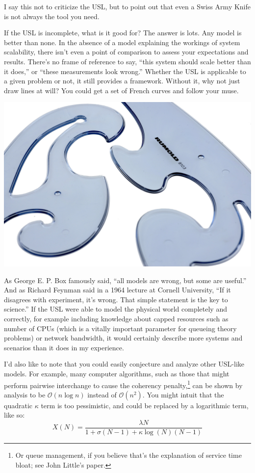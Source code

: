 \documentclass{vivid_layout}
\begin{document}
I say this not to criticize the USL, but to point out that even a Swiss Army
Knife is not always the tool you need.

If the USL is incomplete, what is it good for? The answer is lots.
Any model is better than none. In the absence of a model
explaining the workings of system scalability, there isn't even a point of
comparison to assess your expectations and results. There's no frame of
reference to say, ``this system should scale better than it does,'' or
``these measurements look wrong.'' Whether the USL is applicable to a
given problem or not, it still provides a framework. Without it, why not just
draw lines at will? You could get a set of French curves and follow your muse.
\begin{center}
\includegraphics[width=.75\linewidth,trim={0 8cm 0 0},clip]{scalability/french_curve}
\end{center}

As George E. P. Box famously said, ``all models are wrong, but some are
useful.'' And as Richard Feynman said in a 1964 lecture at Cornell University,
``If it disagrees with experiment, it’s wrong.  That simple statement is the key
to science.'' If the USL were able to model the physical world completely and
correctly, for example including knowledge about capped resources such as number
of CPUs (which is a vitally important parameter for queueing theory problems) or
network bandwidth, it would certainly describe more systems and scenarios than
it does in my experience.

I'd also like to note that you could easily conjecture and analyze other
USL-like models. For example, many computer algorithms, such as those that might
perform pairwise interchange to cause the coherency penalty,\footnote{Or queue
management, if you believe that's the explanation of service time bloat; see
John Little's paper.} can be
shown by analysis to be $\mathcal{O}(n\log{}n)$ instead of $\mathcal{O}(n^2)$.
You might intuit that the quadratic $\kappa$ term is too pessimistic, and could
be replaced by a logarithmic term, like so:
\begin{equation}
X(N) = \frac{\lambda N}{1 + \sigma(N-1) + \kappa \log(N)(N-1)}
\label{usl_log}
\end{equation}
\end{document}

